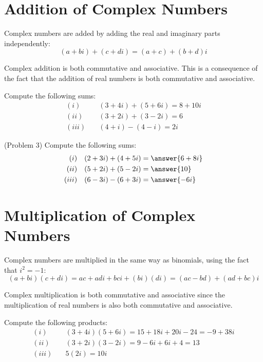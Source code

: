 \documentclass[handout]{ximera}
\begin{document}
\section{Addition of Complex Numbers}

Complex numbers are added by adding the real and imaginary parts independently:
\[
(a+bi) + (c+di) = (a+c) + (b+d)i
\]

Complex addition is both commutative and associative. This is a consequence of the fact that the addition of real numbers is both commutative and associative.

\begin{example}[Example 3]
Compute the following sums:
\begin{align*}
(i)& \quad (3+4i) + (5+6i) = 8+10i \\
(ii)& \quad (3+2i) + (3-2i) = 6 \\
(iii)& \quad (4+i) - (4-i) = 2i
\end{align*}

\end{example}


\begin{problem}(Problem 3)
Compute the following sums:
\begin{align*}
(i)& \quad (2+3i) + (4+5i) = \answer{6+8i} \\
(ii)& \quad(5+2i) + (5-2i) = \answer{10}\\
(iii)& \quad(6-3i) - (6+3i) = \answer{-6i}
\end{align*}
\end{problem}

\section{Multiplication of Complex Numbers}
Complex numbers are multiplied in the same way as binomials, using the fact that $i^2 = -1$:
\[
(a+bi)(c+di) = ac + adi + bci + (bi)(di) = (ac-bd) + (ad+bc)i
\]

Complex multiplication is both commutative and associative since the multiplication of real numbers is also both commutative and associative.

\begin{example}[Example 4]
Compute the following products:
\begin{align*}
(i)& \quad (3+4i)  (5+6i) = 15 + 18i + 20i - 24 = -9 + 38i \\
(ii)& \quad (3+2i)  (3-2i) = 9-6i+6i+4=13 \\
(iii)& \quad 5(2i) = 10i
\end{align*}

\end{example}
\end{document}
